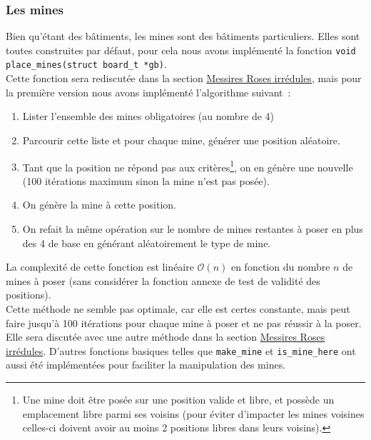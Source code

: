 \subsubsection{Les mines}
\label{sec:mines}
Bien qu'étant des bâtiments, les mines sont des bâtiments particuliers.
Elles sont toutes construites par défaut, pour cela nous avons implémenté la fonction \texttt{void place\_mines(struct board\_t *gb)}. \\
Cette fonction sera rediscutée dans la section \hyperref[sec:mri]{\uline{Messires Roses irrédules}}, mais pour la première version nous avons implémenté l'algorithme suivant~:
\begin{enumerate}
    \setlength\itemsep{0.1em}
    \item Lister l'ensemble des mines obligatoires (au nombre de 4)
    \item Parcourir cette liste et pour chaque mine, générer une position aléatoire.
    \item Tant que la position ne répond pas aux critères\footnote{Une mine doit être posée sur une position valide et libre, et possède un emplacement libre parmi ses voisins (pour éviter d'impacter les mines voisines celles-ci doivent avoir au moins 2 positions libres dans leurs voisins).}, on en génère une nouvelle (100 itérations maximum sinon la mine n'est pas posée).
    \item On génère la mine à cette position.
    \item On refait la même opération sur le nombre de mines restantes à poser en plus des 4 de base en générant aléatoirement le type de mine.
\end{enumerate}
La complexité de cette fonction est linéaire \(\mathcal{O}(n)\) en fonction du nombre \(n\) de mines à poser (sans considérer la fonction annexe de test de validité des positions).\\
Cette méthode ne semble pas optimale, car elle est certes constante, mais peut faire jusqu'à 100 itérations pour chaque mine à poser et ne pas réussir à la poser. Elle sera discutée avec une autre méthode dans la section \hyperref[sec:mri]{\uline{Messires Roses irrédules}}.
D'autres fonctions basiques telles que \texttt{make\_mine} et \texttt{is\_mine\_here} ont aussi été implémentées pour faciliter la manipulation des mines.

